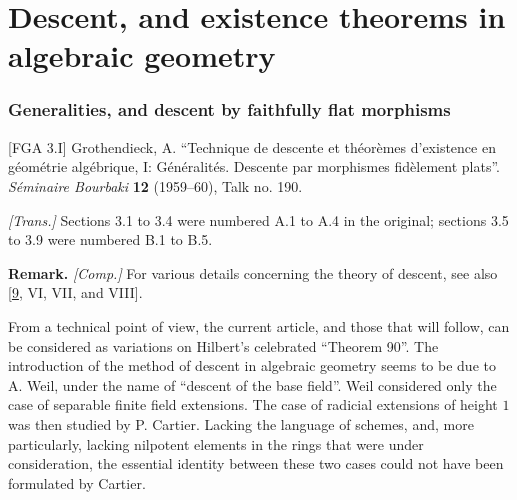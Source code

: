 \documentclass{article}
\newenvironment{rmenv}[1]
  {\phantomsection\par\smallskip\noindent\textbf{#1.}\rmfamily}
  {\par\smallskip}
\newcommand{\oldpage}[1]{\marginpar{\footnotesize$\Big\vert$ \textit{p.~#1}}}
\theoremstyle{definition}
\theoremstyle{definition}
\theoremstyle{definition}
\theoremstyle{definition}
\theoremstyle{remark}
\begin{document}
\hypertarget{part-descent-and-existence-theorems-in-algebraic-geometry}{%
\part*{Descent, and existence theorems in algebraic geometry}\label{part-descent-and-existence-theorems-in-algebraic-geometry}}

\hypertarget{fga-3.i}{%
\section{Generalities, and descent by faithfully flat morphisms}\label{fga-3.i}}

\providecommand{\scr}[1]{{\mathscr{#1}}}
\renewcommand{\cal}[1]{{\mathcal{#1}}}
\renewcommand{\frak}[1]{{\mathfrak{#1}}}
\renewcommand{\geq}{\geqslant}
\renewcommand{\leq}{\leqslant}

\providecommand{\ourrar}[2]{\overset{#1}{\underset{#2}{\rightrightarrows}}}
\providecommand{\oullar}[2]{\overset{#1}{\underset{#2}{\leftleftarrows}}}
\providecommand{\id}{\operatorname{id}}
\providecommand{\Hom}{\operatorname{Hom}}
\providecommand{\shHom}{\mathscr{H}\kern -.5pt om}
\providecommand{\Aut}{\operatorname{Aut}}
\providecommand{\HH}{\operatorname{H}}
\providecommand{\RR}{\operatorname{R}}
\providecommand{\GL}{\operatorname{GL}}
\providecommand{\Ga}{\operatorname{G_a}}
\providecommand{\Gm}{\operatorname{G_m}}
\providecommand{\SL}{\operatorname{SL}}
\providecommand{\Sp}{\operatorname{Sp}}
\providecommand{\Spec}{\operatorname{Spec}}

{[}FGA 3.I{]}
Grothendieck, A.
``Technique de descente et théorèmes d'existence en géométrie algébrique, I: Généralités. Descente par morphismes fidèlement plats''.
\emph{Séminaire Bourbaki} \textbf{12} (1959--60), Talk no. 190.

\emph{{[}Trans.{]}}
Sections 3.1 to 3.4 were numbered A.1 to A.4 in the original;
sections 3.5 to 3.9 were numbered B.1 to B.5.

\begin{rmenv}{Remark}
\emph{{[}Comp.{]}}
For various details concerning the theory of descent, see also {[}\protect\hyperlink{ref-Gro1960b}{9}, VI, VII, and VIII{]}.

\end{rmenv}

\oldpage{190-01}From a technical point of view, the current article, and those that will follow, can be considered as variations on Hilbert's celebrated ``Theorem 90''.
The introduction of the method of descent in algebraic geometry seems to be due to A. Weil, under the name of ``descent of the base field''.
Weil considered only the case of separable finite field extensions.
The case of radicial extensions of height \(1\) was then studied by P. Cartier.
Lacking the language of schemes, and, more particularly, lacking nilpotent elements in the rings that were under consideration, the essential identity between these two cases could not have been formulated by Cartier.
\end{document}
